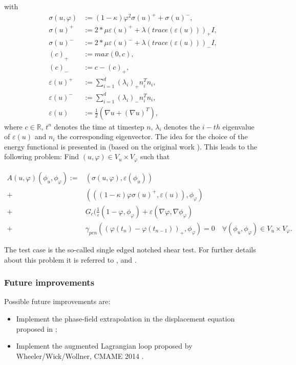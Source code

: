 with
\begin{align*}
\sigma(u,\varphi)&:= (1-\kappa)\varphi^2 \sigma(u)^+ + \sigma(u)^-,\\
\sigma(u)^+ &:= 2*\mu \varepsilon(u)^+ +\lambda (trace(\varepsilon(u)))_+ I,\\
\sigma(u)^- &:= 2*\mu \varepsilon(u)^- +\lambda (trace(\varepsilon(u)))_- I,\\
(c)_+ &:= max(0, c), \\
(c)_- &:= c-(c)_+, \\
\varepsilon(u)^+ &:= \sum_{i=1}^{d} (\lambda_i)_+ n_i^T n_i,\\
\varepsilon(u)^- &:= \sum_{i=1}^{d} (\lambda_i)_- n_i^T n_i,\\
\varepsilon(u)   &:= \frac{1}{2}(\nabla u +(\nabla u)^T),
\end{align*}
where $c \in \mathbb{R}$, $t^n$ denotes the time at timestep $n$, $\lambda_i$ denotes the $i-th$ eigenvalue of $\varepsilon(u)$ and $n_i$ the corresponding eigenvector.
The idea for the choice of the energy functional is presented
in \cite{MieHofWel2010} (based on the original work \cite{BourFraMar00,BourFraMar08,FraMar98}).
This leads to the following problem: Find $(u, \varphi) \in V_u \times V_\varphi$ such that

\begin{align*}
A(u,\varphi)(\phi_u,\phi_\varphi):=& (\sigma(u,\varphi),\varepsilon(\phi_u)) \\
+& (((1-\kappa)\varphi \sigma(u)^+,\varepsilon(u)),\phi_\varphi)\\
 +& G_c(\frac{1}{\varepsilon} (1 - \varphi,\phi_\varphi)+\varepsilon (\nabla \varphi, \nabla \phi_\varphi)\\
+&\gamma_{pen} ((\varphi(t_n)-\varphi(t_{n-1}))_+,\phi_\varphi)=0 \quad \forall (\phi_u, \phi_\varphi) \in V_u \times V_\varphi.
\end{align*}

The test case is the so-called single edged notched 
shear test. For further details about this problem it is referred
to \cite{MieHofWel2010,BoVeScoHuLa12}, and \cite{WeWiWo2014}.



\subsubsection{Future improvements}
Possible future improvements are:
\begin{itemize}
\item Implement the phase-field extrapolation in the displacement equation proposed in \cite{HeWheWi15};
\item Implement the augmented Lagrangian loop proposed by
Wheeler/Wick/Wollner, CMAME 2014 \cite{WeWiWo2014}. 
\end{itemize}

%
%



